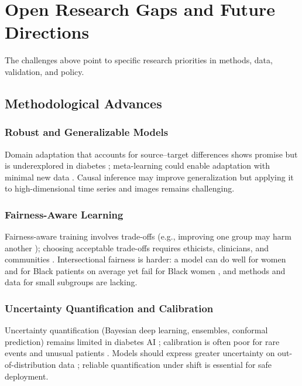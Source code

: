 \section{Open Research Gaps and Future Directions}

The challenges above point to specific research priorities in methods, data, validation, and policy.

\subsection{Methodological Advances}

\subsubsection{Robust and Generalizable Models}

Domain adaptation that accounts for source–target differences shows promise but is underexplored in diabetes \cite{fahmy2025exploring, chen2024crossmodality}; meta-learning could enable adaptation with minimal new data \cite{zhu2021deep}. Causal inference may improve generalization \cite{oikonomou2023machine, jacobs2023artificial} but applying it to high-dimensional time series and images remains challenging.

\subsubsection{Fairness-Aware Learning}

Fairness-aware training \cite{fahmy2025exploring, wang2024ai} involves trade-offs (e.g., improving one group may harm another \cite{fahmy2025exploring}); choosing acceptable trade-offs requires ethicists, clinicians, and communities \cite{mackenzie2023diabetes, liu2025scoping}. Intersectional fairness is harder: a model can do well for women and for Black patients on average yet fail for Black women \cite{wang2024ai, haider2024algorithmic}, and methods and data for small subgroups are lacking.

\subsubsection{Uncertainty Quantification and Calibration}

Uncertainty quantification (Bayesian deep learning, ensembles, conformal prediction) remains limited in diabetes AI \cite{contreras2018artificial, han2024gluensemble, chadaga2024interpretable}; calibration is often poor for rare events and unusual patients \cite{wang2024ai, liu2025scoping}. Models should express greater uncertainty on out-of-distribution data \cite{prioleau2025deep, jacobs2023artificial}; reliable quantification under shift is essential for safe deployment.


